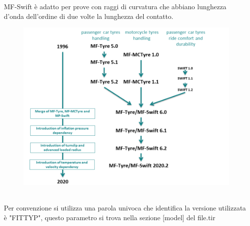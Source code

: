 MF-Swift è adatto per prove con raggi di curvatura che abbiano lunghezza d'onda dell'ordine di due volte la lunghezza del contatto.\\ 
\begin{figure}[!h]
    \centering
    \includegraphics[scale=0.8]{Immagini/Tyres/MF-Tire History.png}
    \caption{}
    \label{fig:MF-Tire version history}
\end{figure}
\\
Per convenzione si utilizza una parola univoca che identifica la versione utilizzata è "FITTYP", questo parametro si trova nella sezione [model] del file.tir

